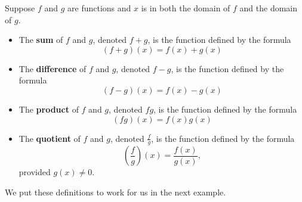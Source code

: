 \documentclass{ximera}
\begin{document}
\begin{definition}  \label{functionarithmeticdefn}   Suppose $f$ and $g$ are functions and $x$ is in both the domain of $f$ and the domain of $g$.
\begin{itemize}

\item  The  \textbf{sum} of $f$ and $g$, denoted $f+g$, is the function defined by the formula \[(f+g)(x) = f(x) + g(x)\]

\item  The  \textbf{difference} of $f$ and $g$, denoted $f-g$, is the function defined by the formula \[(f-g)(x) = f(x) - g(x)\]

\item  The  \textbf{product} of $f$ and $g$, denoted $fg$, is the function defined by the formula \[(fg)(x) = f(x)g(x)\]

\item  The  \textbf{quotient} of $f$ and $g$, denoted $\frac{f}{g}$, is the function defined by the formula \[\left(\frac{f}{g}\right)(x) = \frac{f(x)}{g(x)},\] provided $g(x) \neq 0$.


\end{itemize}

\end{definition}






We put these definitions to work for us in the next example.
\end{document}

